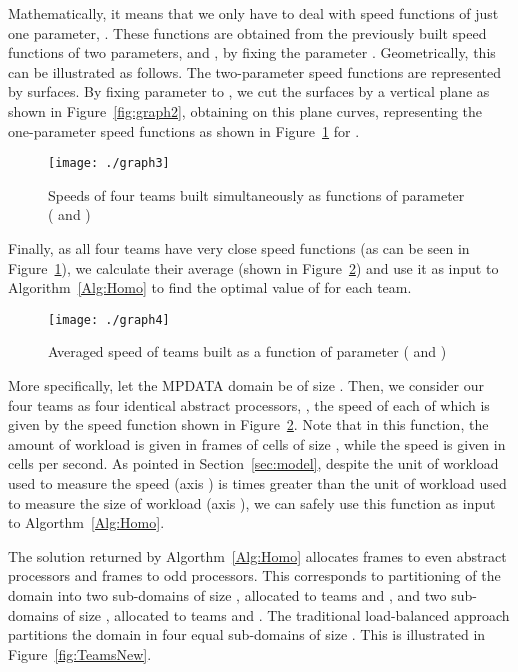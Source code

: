 \documentclass{acm_proc_article-sp}
\begin{document}
Mathematically, it means that we only have to deal with speed functions of just one parameter, . These functions are obtained from the previously built speed functions of two parameters,  and , by fixing the parameter . Geometrically, this can be illustrated as follows. The two-parameter speed functions are represented by surfaces. By fixing parameter  to , we cut the surfaces by a vertical plane  as shown in Figure~\ref{fig:graph2}, obtaining on this plane curves, representing the one-parameter speed functions as shown in Figure~\ref{fig:graph3} for .


\begin{figure}[h!]
\begin{center}
\texttt{[image: ./graph3]}
\caption{Speeds of four teams built simultaneously as functions of parameter  (\mbox{} and \mbox{})}
\label{fig:graph3}
\end{center}
\end{figure} 

Finally, as all four teams have very close speed functions (as can be seen in Figure~\ref{fig:graph3}), we calculate their average (shown in Figure~\ref{fig:graph4}) and use it as input to Algorithm~\ref{Alg:Homo} to find the optimal value of  for each team.

\begin{figure}[h!]
\begin{center}
\texttt{[image: ./graph4]}
\caption{Averaged speed of  teams built as a function of parameter  (\mbox{} and \mbox{})}
\label{fig:graph4}
\end{center}
\end{figure} 


More specifically, let the MPDATA domain be of size . Then,
we consider our four teams as four identical abstract processors, , the speed of each of which is given by the speed function shown in Figure~\ref{fig:graph4}. Note that in this function, the amount of workload is given in frames of cells of size , while the speed is given in cells per second. As pointed in Section~\ref{sec:model}, despite the unit of workload used to measure the speed (axis ) is  times greater than the unit of workload used to measure the size of workload (axis ), we can safely use this function as input to Algorthm~\ref{Alg:Homo}.

The solution returned by Algorthm~\ref{Alg:Homo} allocates  frames to even abstract processors and  frames to odd processors. This corresponds to partitioning of the  domain into two sub-domains of size  , allocated to teams  and , and two sub-domains of size  , allocated to teams  and . The traditional load-balanced approach partitions the domain in four equal sub-domains of size . This is illustrated in Figure~\ref{fig:TeamsNew}.
\end{document}
